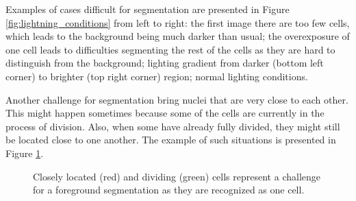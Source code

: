 Examples of cases difficult for segmentation are presented in Figure \ref{fig:lightning_conditions} from left to right: the first image there are too few cells, which leads to the background being much darker than usual; the overexposure of one cell leads to difficulties segmenting the rest of the cells as they are hard to distinguish from the background; lighting gradient from darker (bottom left corner) to brighter (top right corner) region; normal lighting conditions.

Another challenge for segmentation bring nuclei that are very close to each other. This might happen sometimes because some of the cells are currently in the process of division. Also, when some have already fully divided, they might still be located close to one another. The example of such situations is presented in Figure \ref{fig:closely-located-cells}.

\begin{figure}[H]
    \centering
    \qquad
    \caption[Closely located (red) and dividing (green) cells]%
    {Closely located (red) and dividing (green) cells represent a challenge for a foreground segmentation as they are recognized as one cell.}
    \label{fig:closely-located-cells}
\end{figure}

